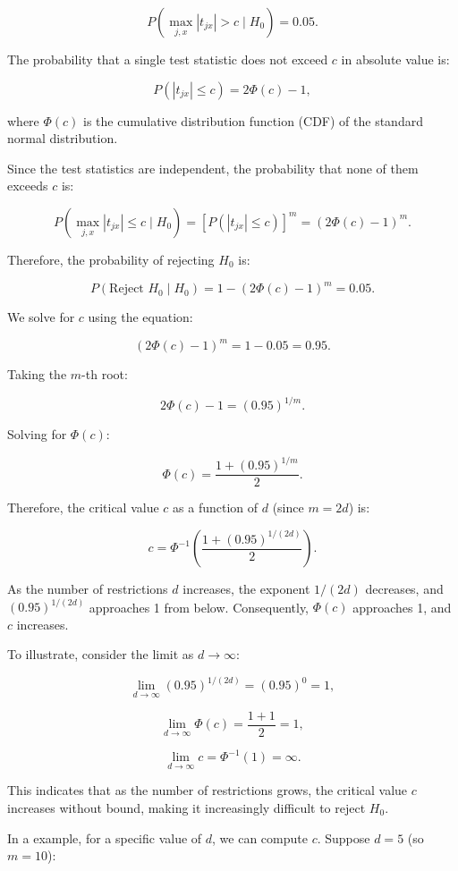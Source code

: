 \documentclass{article}
\begin{document}
\[
P\left( \max_{j,x} |t_{jx}| > c \mid H_0 \right) = 0.05.
\]

The probability that a single test statistic does not exceed \( c \) in absolute value is:

\[
P\left( |t_{jx}| \leq c \right) = 2\Phi(c) - 1,
\]

where \( \Phi(c) \) is the cumulative distribution function (CDF) of the standard normal distribution.

Since the test statistics are independent, the probability that none of them exceeds \( c \) is:

\[
P\left( \max_{j,x} |t_{jx}| \leq c \mid H_0 \right) = \left[ P\left( |t_{jx}| \leq c \right) \right]^m = \left( 2\Phi(c) - 1 \right)^m.
\]

Therefore, the probability of rejecting \( H_0 \) is:

\[
P\left( \text{Reject } H_0 \mid H_0 \right) = 1 - \left( 2\Phi(c) - 1 \right)^m = 0.05.
\]

We solve for \( c \) using the equation:

\[
\left( 2\Phi(c) - 1 \right)^m = 1 - 0.05 = 0.95.
\]

Taking the \( m \)-th root:

\[
2\Phi(c) - 1 = (0.95)^{1/m}.
\]

Solving for \( \Phi(c) \):

\[
\Phi(c) = \frac{1 + (0.95)^{1/m}}{2}.
\]

Therefore, the critical value \( c \) as a function of \( d \) (since \( m = 2d \)) is:

\[
c = \Phi^{-1}\left( \frac{1 + (0.95)^{1/(2d)}}{2} \right).
\]

As the number of restrictions \( d \) increases, the exponent \( 1/(2d) \) decreases, and \( (0.95)^{1/(2d)} \) approaches 1 from below. Consequently, \( \Phi(c) \) approaches 1, and \( c \) increases.

To illustrate, consider the limit as \( d \to \infty \):

\[
\lim_{d \to \infty} (0.95)^{1/(2d)} = (0.95)^{0} = 1,
\]

\[
\lim_{d \to \infty} \Phi(c) = \frac{1 + 1}{2} = 1,
\]

\[
\lim_{d \to \infty} c = \Phi^{-1}(1) = \infty.
\]

This indicates that as the number of restrictions grows, the critical value \( c \) increases without bound, making it increasingly difficult to reject \( H_0 \).

In a example, for a specific value of \( d \), we can compute \( c \). Suppose \( d = 5 \) (so \( m = 10 \)):
\end{document}
